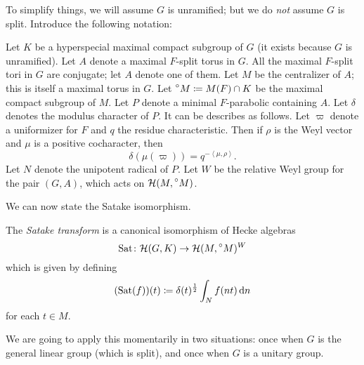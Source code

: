 To simplify things, we will assume $G$ is unramified;
but we do \emph{not} assume $G$ is split.
Introduce the following notation:
\begin{itemize}
  \ii Let $K$ be a hyperspecial maximal compact subgroup of $G$
  (it exists because $G$ is unramified).
  \ii Let $A$ denote a maximal $F$-split torus in $G$.
  All the maximal $F$-split tori in $G$ are conjugate; let $A$ denote one of them.
  \ii Let $M$ be the centralizer of $A$; this is itself a maximal torus in $G$.
  \ii Let $\prescript{\circ}{} M \coloneqq M(F) \cap K$
  be the maximal compact subgroup of $M$.
  \ii Let $P$ denote a minimal $F$-parabolic containing $A$.
  \ii Let $\delta$ denotes the modulus character of $P$.
  It can be describes as follows.
  Let $\varpi$ denote a uniformizer for $F$ and $q$ the residue characteristic.
  Then if $\rho$ is the Weyl vector and $\mu$ is a positive cocharacter, then
  \[ \delta(\mu(\varpi)) = q^{- \left< \mu, \rho\right>}. \]
  \ii Let $N$ denote the unipotent radical of $P$.
  \ii Let $W$ be the relative Weyl group for the pair $(G,A)$,
  which acts on $\mathcal H(M, \prescript{\circ}{} M)$.
\end{itemize}
We can now state the Satake isomorphism.
\begin{definition}
  The \emph{Satake transform} is a canonical isomorphism of Hecke algebras
  \[ \operatorname{Sat} \colon \mathcal H(G, K) \to \mathcal H(M, \prescript{\circ}{} M)^W \]
  which is given by defining
  \[ (\Sat(f))(t) \coloneqq \delta(t)^\half \int_N f(nt) \odif n  \]
  for each $t \in M$.
\end{definition}
We are going to apply this momentarily in two situations:
once when $G$ is the general linear group (which is split),
and once when $G$ is a unitary group.


